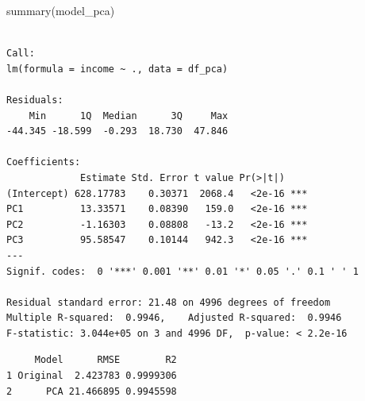 \documentclass[
  letterpaper,
  DIV=11,
  numbers=noendperiod]{scrartcl}
\newenvironment{Shaded}{\begin{snugshade}}{\end{snugshade}}
\newcommand{\AttributeTok}[1]{\textcolor[rgb]{0.40,0.45,0.13}{#1}}
\newcommand{\DecValTok}[1]{\textcolor[rgb]{0.68,0.00,0.00}{#1}}
\newcommand{\FunctionTok}[1]{\textcolor[rgb]{0.28,0.35,0.67}{#1}}
\newcommand{\NormalTok}[1]{\textcolor[rgb]{0.00,0.23,0.31}{#1}}
\newcommand{\OtherTok}[1]{\textcolor[rgb]{0.00,0.23,0.31}{#1}}
\newcommand{\SpecialCharTok}[1]{\textcolor[rgb]{0.37,0.37,0.37}{#1}}
\newcommand{\StringTok}[1]{\textcolor[rgb]{0.13,0.47,0.30}{#1}}
\begin{document}
\begin{Shaded}
\begin{Highlighting}[]
\FunctionTok{summary}\NormalTok{(model\_pca)  }
\end{Highlighting}
\end{Shaded}

\begin{verbatim}

Call:
lm(formula = income ~ ., data = df_pca)

Residuals:
    Min      1Q  Median      3Q     Max 
-44.345 -18.599  -0.293  18.730  47.846 

Coefficients:
             Estimate Std. Error t value Pr(>|t|)    
(Intercept) 628.17783    0.30371  2068.4   <2e-16 ***
PC1          13.33571    0.08390   159.0   <2e-16 ***
PC2          -1.16303    0.08808   -13.2   <2e-16 ***
PC3          95.58547    0.10144   942.3   <2e-16 ***
---
Signif. codes:  0 '***' 0.001 '**' 0.01 '*' 0.05 '.' 0.1 ' ' 1

Residual standard error: 21.48 on 4996 degrees of freedom
Multiple R-squared:  0.9946,    Adjusted R-squared:  0.9946 
F-statistic: 3.044e+05 on 3 and 4996 DF,  p-value: < 2.2e-16
\end{verbatim}

\begin{Shaded}
\end{Shaded}

\begin{verbatim}
     Model      RMSE        R2
1 Original  2.423783 0.9999306
2      PCA 21.466895 0.9945598
\end{verbatim}
\end{document}
